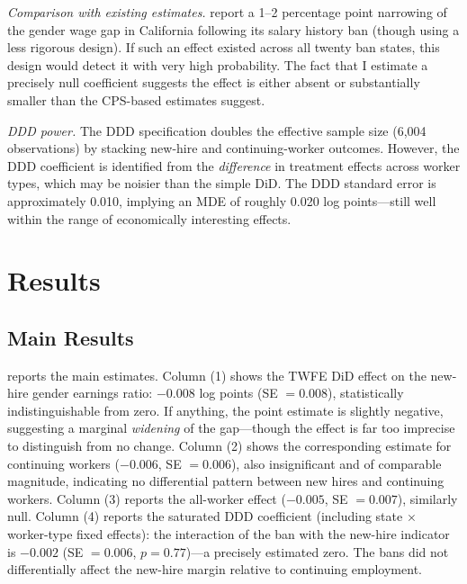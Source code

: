 \documentclass[12pt]{article}
\begin{document}
\textit{Comparison with existing estimates.} \citet{hansen2020information} report a 1--2 percentage point narrowing of the gender wage gap in California following its salary history ban (though using a less rigorous design). If such an effect existed across all twenty ban states, this design would detect it with very high probability. The fact that I estimate a precisely null coefficient suggests the effect is either absent or substantially smaller than the CPS-based estimates suggest.

\textit{DDD power.} The DDD specification doubles the effective sample size (6,004 observations) by stacking new-hire and continuing-worker outcomes. However, the DDD coefficient is identified from the \textit{difference} in treatment effects across worker types, which may be noisier than the simple DiD. The DDD standard error is approximately 0.010, implying an MDE of roughly 0.020 log points---still well within the range of economically interesting effects.


\section{Results}\label{sec:results}

\subsection{Main Results}

 reports the main estimates. Column (1) shows the TWFE DiD effect on the new-hire gender earnings ratio: $-0.008$ log points (SE $= 0.008$), statistically indistinguishable from zero. If anything, the point estimate is slightly negative, suggesting a marginal \textit{widening} of the gap---though the effect is far too imprecise to distinguish from no change. Column (2) shows the corresponding estimate for continuing workers ($-0.006$, SE $= 0.006$), also insignificant and of comparable magnitude, indicating no differential pattern between new hires and continuing workers. Column (3) reports the all-worker effect ($-0.005$, SE $= 0.007$), similarly null. Column (4) reports the saturated DDD coefficient (including state $\times$ worker-type fixed effects): the interaction of the ban with the new-hire indicator is $-0.002$ (SE $= 0.006$, $p = 0.77$)---a precisely estimated zero. The bans did not differentially affect the new-hire margin relative to continuing employment.


\end{document}
